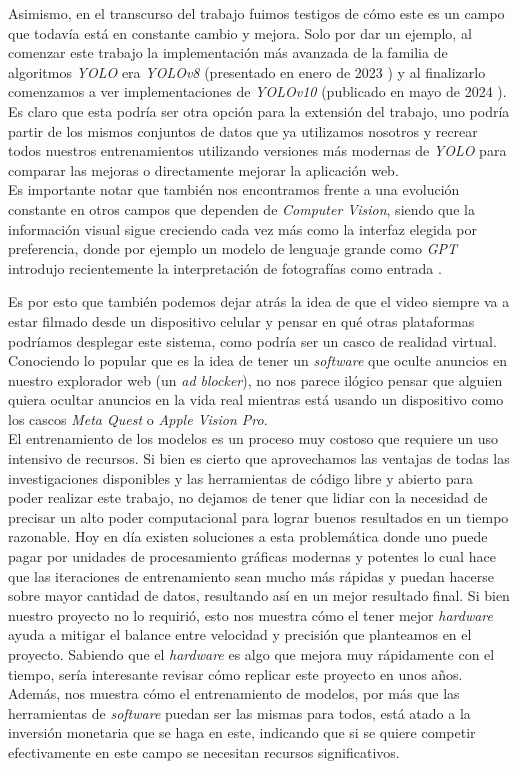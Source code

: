 \documentclass[a4paper]{article}
\begin{document}
Asimismo, en el transcurso del trabajo fuimos testigos de cómo este es un campo que todavía está en constante cambio y mejora. Solo por dar un ejemplo, al comenzar este trabajo la implementación más avanzada de la familia de algoritmos \textit{YOLO} era \textit{YOLOv8} (presentado en enero de 2023 \cite{yolov8}) y al finalizarlo comenzamos a ver implementaciones de \textit{YOLOv10} (publicado en mayo de 2024 \cite{yolov10}). Es claro que esta podría ser otra opción para la extensión del trabajo, uno podría partir de los mismos conjuntos de datos que ya utilizamos nosotros y recrear todos nuestros entrenamientos utilizando versiones más modernas de \textit{YOLO} para comparar las mejoras o directamente mejorar la aplicación web. \\

Es importante notar que también nos encontramos frente a una evolución constante en otros campos que dependen de \textit{Computer Vision}, siendo que la información visual sigue creciendo cada vez más como la interfaz elegida por preferencia, donde por ejemplo un modelo de lenguaje grande como \textit{GPT} introdujo recientemente la interpretación de fotografías como entrada \cite{chatgpt-vision}.

Es por esto que también podemos dejar atrás la idea de que el video siempre va a estar filmado desde un dispositivo celular y pensar en qué otras plataformas podríamos desplegar este sistema, como podría ser un casco de realidad virtual. Conociendo lo popular que es la idea de tener un \textit{software} que oculte anuncios en nuestro explorador web (un \textit{ad blocker}), no nos parece ilógico pensar que alguien quiera ocultar anuncios en la vida real mientras está usando un dispositivo como los cascos \textit{Meta Quest} o \textit{Apple Vision Pro}. \\

El entrenamiento de los modelos es un proceso muy costoso que requiere un uso intensivo de recursos. Si bien es cierto que aprovechamos las ventajas de todas las investigaciones disponibles y las herramientas de código libre y abierto para poder realizar este trabajo, no dejamos de tener que lidiar con la necesidad de precisar un alto poder computacional para lograr buenos resultados en un tiempo razonable. Hoy en día existen soluciones a esta problemática donde uno puede pagar por unidades de procesamiento gráficas modernas y potentes lo cual hace que las iteraciones de entrenamiento sean mucho más rápidas y puedan hacerse sobre mayor cantidad de datos, resultando así en un mejor resultado final. Si bien nuestro proyecto no lo requirió, esto nos muestra cómo el tener mejor \textit{hardware} ayuda a mitigar el balance entre velocidad y precisión que planteamos en el proyecto. Sabiendo que el \textit{hardware} es algo que mejora muy rápidamente con el tiempo, sería interesante revisar cómo replicar este proyecto en unos años. Además, nos muestra cómo el entrenamiento de modelos, por más que las herramientas de \textit{software} puedan ser las mismas para todos, está atado a la inversión monetaria que se haga en este, indicando que si se quiere competir efectivamente en este campo se necesitan recursos significativos. \\
\end{document}
